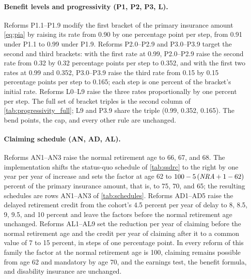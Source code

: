 \paragraph{Benefit levels and progressivity (P1, P2, P3, L).}
Reforms P1.1--P1.9 modify the first bracket of the primary insurance amount \eqref{eq:pia} by raising its rate from 0.90 by one percentage point per step, from 0.91 under P1.1 to 0.99 under P1.9. %
Reforms P2.0--P2.9 and P3.0--P3.9 target the second and third brackets: with the first rate at 0.99, P2.0--P2.9 raise the second rate from 0.32 by 0.32 percentage points per step to 0.352, and with the first two rates at 0.99 and 0.352, P3.0--P3.9 raise the third rate from 0.15 by 0.15 percentage points per step to 0.165; each step is one percent of the bracket's initial rate. %
Reforms L0--L9 raise the three rates proportionally by one percent per step. %
The full set of bracket triples is the second column of \autoref{tab:progressivity_full}; L9 and P3.9 share the triple (0.99, 0.352, 0.165). %
The bend points, the cap, and every other rule are unchanged.

\paragraph{Claiming schedule (AN, AD, AL).}
Reforms AN1--AN3 raise the normal retirement age to 66, 67, and 68. %
The implementation shifts the status-quo schedule of \autoref{tab:ssdrc} to the right by one year per year of increase and sets the factor at age 62 to $100-5\,(\mathit{NRA}+1-62)$ percent of the primary insurance amount, that is, to 75, 70, and 65; the resulting schedules are rows AN1--AN3 of \autoref{tab:schedules}. %
Reforms AD1--AD5 raise the delayed retirement credit from the cohort's 4.5 percent per year of delay to 8, 8.5, 9, 9.5, and 10 percent and leave the factors before the normal retirement age unchanged. %
Reforms AL1--AL9 set the reduction per year of claiming before the normal retirement age and the credit per year of claiming after it to a common value of 7 to 15 percent, in steps of one percentage point. %
In every reform of this family the factor at the normal retirement age is 100, claiming remains possible from age 62 and mandatory by age 70, and the earnings test, the benefit formula, and disability insurance are unchanged. %


